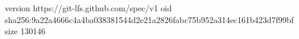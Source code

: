 version https://git-lfs.github.com/spec/v1
oid sha256:9a22a4666c4a4ba038381544d2e21a2826fabc75b952a314ec161b423d7f99bf
size 130146
